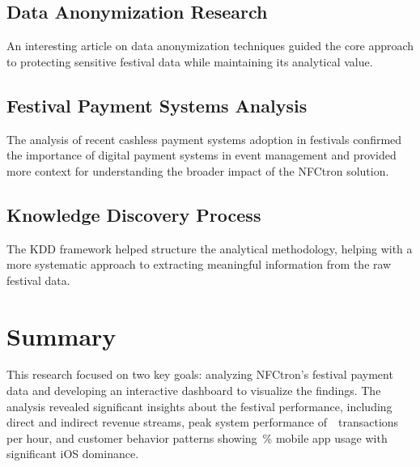 \small{}
\small{}

\subsection*{Data Anonymization Research}
\label{subsec:data-anonymization-research}
An interesting article on data anonymization techniques guided the core approach to protecting sensitive festival data while maintaining its analytical value.

\begin{flushleft}
	\small{}
\end{flushleft}

\subsection*{Festival Payment Systems Analysis}
\label{subsec:festival-payment-systems-analysis}
The analysis of recent cashless payment systems adoption in festivals confirmed the importance of digital payment systems in event management and provided more context for understanding the broader impact of the NFCtron solution.

\small{}

\subsection*{Knowledge Discovery Process}
\label{subsec:knowledge-discovery-process}
The KDD framework helped structure the analytical methodology, helping with a more systematic approach to extracting meaningful information from the raw festival data.

\small{}

\pagebreak[4]

\section*{Summary}
\label{sec:summary}
This research focused on two key goals: analyzing NFCtron's festival payment data and developing an interactive dashboard to visualize the findings.
The analysis revealed significant insights about the festival performance, including direct and indirect revenue streams, peak system performance of~~transactions per hour,
and customer behavior patterns showing~\% mobile app usage with significant iOS dominance.

